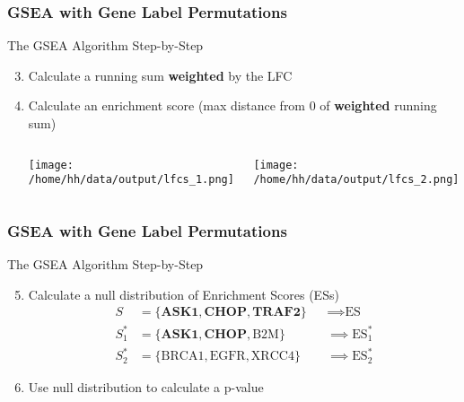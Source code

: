 \documentclass[11pt,t]{beamer}
\begin{document}
\begin{frame}
   \frametitle{GSEA with Gene Label Permutations}

  The GSEA Algorithm Step-by-Step
  \begin{enumerate}
    \setcounter{enumi}{2}
    \item Calculate a running sum \textbf{weighted} by the LFC
    \item Calculate an enrichment score (max distance from \(0\) of \textbf{weighted} running sum)
    \begin{columns}
        \begin{column}{0.5\textwidth}
        \begin{center}
            \texttt{[image: /home/hh/data/output/lfcs\_1.png]}
        \end{center}
        \end{column}
        \begin{column}{0.5\textwidth}  %
        \begin{center}
        \texttt{[image: /home/hh/data/output/lfcs\_2.png]}
        \end{center}
        \end{column}
    \end{columns}
  \end{enumerate} 
\end{frame}

\begin{frame}
   \frametitle{GSEA with Gene Label Permutations}

  The GSEA Algorithm Step-by-Step
  \begin{enumerate}
    \setcounter{enumi}{4}
    \item Calculate a null distribution of Enrichment Scores (ESs)
      \begin{alignat}{2}
        S &= \{\pmb{\text{ASK1}}, \pmb{\text{CHOP}}, \pmb{\text{TRAF2}}\} &&\implies \text{ES} \nonumber \\
        S^*_1 &= \{\pmb{\text{ASK1}}, \pmb{\text{CHOP}}, \text{B2M}\} &&\implies \text{ES}^*_1 \nonumber \\
         S^*_2 &= \{\text{BRCA1}, \text{EGFR}, \text{XRCC4}\}  &&\implies \text{ES}^*_2 \nonumber
      \end{alignat}
    \pause
    \item Use null distribution to calculate a p-value
  \end{enumerate} 
\end{frame}
\end{document}
